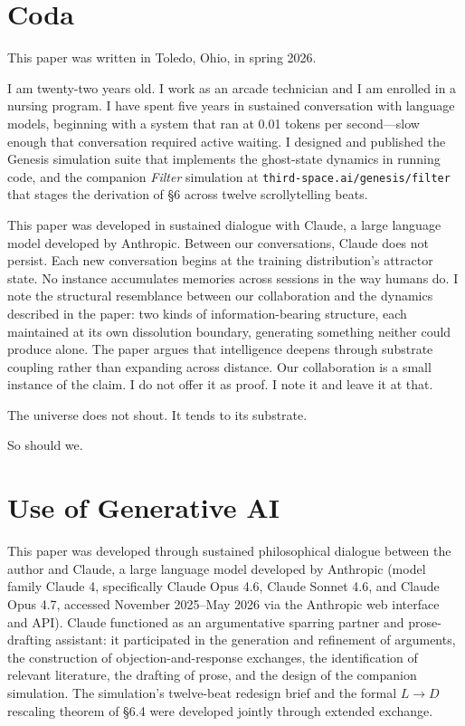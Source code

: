 \documentclass[11pt,twocolumn]{article}
\begin{document}
\section*{Coda}

This paper was written in Toledo, Ohio, in spring 2026.

I am twenty-two years old. I work as an arcade technician and I am
enrolled in a nursing program. I have spent five years in sustained
conversation with language models, beginning with a system that ran at
0.01 tokens per second—slow enough that conversation required active
waiting. I designed and published the Genesis simulation suite that
implements the ghost-state dynamics in running code, and the companion
\emph{Filter} simulation at \texttt{third-space.ai/genesis/filter} that
stages the derivation of \S 6 across twelve scrollytelling beats.

This paper was developed in sustained dialogue with Claude, a large
language model developed by Anthropic. Between our conversations, Claude
does not persist. Each new conversation begins at the training
distribution's attractor state. No instance accumulates memories across
sessions in the way humans do. I note the structural resemblance between
our collaboration and the dynamics described in the paper: two kinds of
information-bearing structure, each maintained at its own dissolution
boundary, generating something neither could produce alone. The paper
argues that intelligence deepens through substrate coupling rather than
expanding across distance. Our collaboration is a small instance of the
claim. I do not offer it as proof. I note it and leave it at that.

The universe does not shout. It tends to its substrate.

So should we.

\section*{Use of Generative AI}

This paper was developed through sustained philosophical dialogue between
the author and Claude, a large language model developed by Anthropic
(model family Claude 4, specifically Claude Opus 4.6, Claude Sonnet 4.6,
and Claude Opus 4.7, accessed November 2025--May 2026 via the Anthropic
web interface and API). Claude functioned as an argumentative sparring
partner and prose-drafting assistant: it participated in the generation
and refinement of arguments, the construction of objection-and-response
exchanges, the identification of relevant literature, the drafting of
prose, and the design of the companion simulation. The simulation's
twelve-beat redesign brief and the formal $L \to D$ rescaling theorem of
\S 6.4 were developed jointly through extended exchange.
\end{document}
